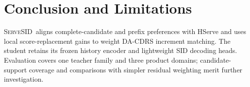 \documentclass[sigconf, anonymous, review]{acmart}
\newcommand{\method}{\textsc{ServeSID}}
\begin{document}
\section{Conclusion and Limitations}
\label{sec:conclusion}

\method\ aligns complete-candidate and prefix preferences
with HServe and uses local score-replacement gains to weight
DA-CDRS increment matching. The student retains its frozen
history encoder and lightweight SID decoding heads.
Evaluation covers one teacher family and three product
domains; candidate-support coverage and comparisons with
simpler residual weighting merit further investigation.

\par\label{www:body-end}



\ifdefined\BuildSubmissionAppendix
  \appendix
  
\fi
\end{document}
